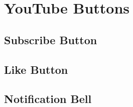\chapter{YouTube Buttons}

\section{Subscribe Button}
\section{Like Button}
\section{Notification Bell}
